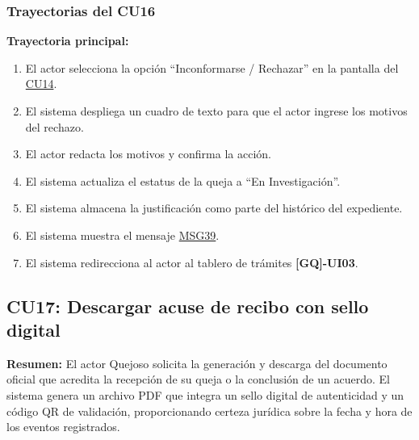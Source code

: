 \begin{appendices}
\subsubsection{Trayectorias del CU16}

\textbf{Trayectoria principal:}
\begin{enumerate}[nosep]
    \item El actor selecciona la opción ``Inconformarse / Rechazar'' en la pantalla del \hyperlink{anexo:casos_uso}{CU14}.
    \item El sistema despliega un cuadro de texto para que el actor ingrese los motivos del rechazo.
    \item El actor redacta los motivos y confirma la acción.
    \item El sistema actualiza el estatus de la queja a ``En Investigación''.
    \item El sistema almacena la justificación como parte del histórico del expediente.
    \item El sistema muestra el mensaje \hyperlink{msg:MSG39}{MSG39}.
    \item El sistema redirecciona al actor al tablero de trámites \textbf{[GQ]-UI03}.
\end{enumerate}

\subsection{CU17: Descargar acuse de recibo con sello digital}

\textbf{Resumen:} 
El actor Quejoso solicita la generación y descarga del documento oficial que acredita la recepción de su queja o la conclusión de un acuerdo. El sistema genera un archivo PDF que integra un sello digital de autenticidad y un código QR de validación, proporcionando certeza jurídica sobre la fecha y hora de los eventos registrados.


\end{appendices}
